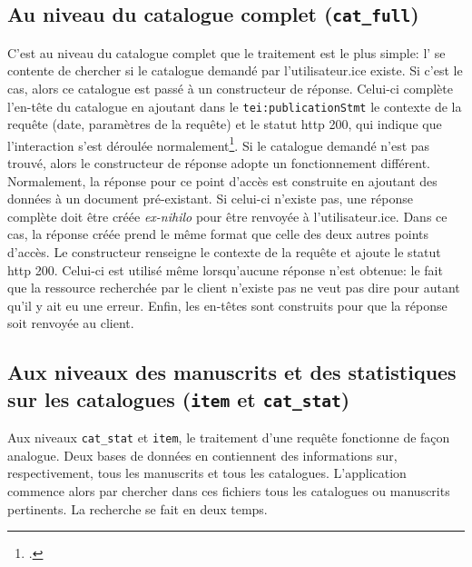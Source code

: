\subsection{Au niveau du catalogue complet (\texttt{cat\_full})}
C'est au niveau du catalogue complet que le traitement est le plus simple: l'\api{} se contente de chercher si le catalogue demandé par l'utilisateur.ice existe. Si c'est le cas, alors ce catalogue est passé à un constructeur de réponse. Celui-ci complète l'en-tête du catalogue en ajoutant dans le \texttt{tei:publicationStmt} le contexte de la requête (date, paramètres de la requête) et le statut \gls{http} 200, qui indique que l'interaction s'est déroulée normalement\footcite[§15.3.1 200 \textit{OK}]{fielding_http_2022}. Si le catalogue demandé n'est pas trouvé, alors le constructeur de réponse adopte un fonctionnement différent. Normalement, la réponse pour ce point d'accès est construite en ajoutant des données à un document pré-existant. Si celui-ci n'existe pas, une réponse complète doit être créée \textit{ex-nihilo} pour être renvoyée à l'utilisateur.ice. Dans ce cas, la réponse créée prend le même format que celle des deux autres points d'accès. Le constructeur renseigne le contexte de la requête et ajoute le statut \gls{http} 200. Celui-ci est utilisé même lorsqu'aucune réponse n'est obtenue: le fait que la ressource recherchée par le client n'existe pas ne veut pas dire pour autant qu'il y ait eu une erreur. Enfin, les en-têtes sont construits pour que la réponse soit renvoyée au client.


\subsection{Aux niveaux des manuscrits et des statistiques sur les catalogues (\texttt{item} et \texttt{cat\_stat})}
Aux niveaux \texttt{cat\_stat} et \texttt{item}, le traitement d'une requête fonctionne de façon analogue. Deux bases de données en \json{} contiennent des informations sur, respectivement, tous les manuscrits et tous les catalogues. L'application commence alors par chercher dans ces fichiers tous les catalogues ou manuscrits pertinents. La recherche se fait en deux temps.

